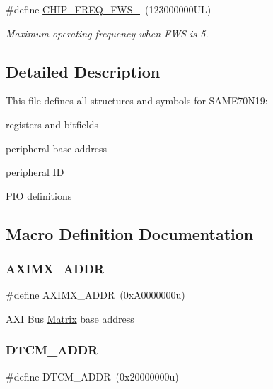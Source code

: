 \begin{DoxyCompactItemize}
\mbox{\label{group__SAME70N19__definitions_ga3b66824f858591135877b369f98d48a5}} 
\#define \mbox{\hyperlink{group__SAME70N19__definitions_ga3b66824f858591135877b369f98d48a5}{C\+H\+I\+P\+\_\+\+F\+R\+E\+Q\+\_\+\+F\+W\+S\+\_}}~(123000000\+U\+L)
\begin{DoxyCompactList}\small\item\em Maximum operating frequency when F\+WS is 5. \end{DoxyCompactList}\end{DoxyCompactItemize}


\subsection{Detailed Description}
This file defines all structures and symbols for S\+A\+M\+E70\+N19\+:
\begin{DoxyItemize}
\item registers and bitfields
\item peripheral base address
\item peripheral ID
\item P\+IO definitions 
\end{DoxyItemize}

\subsection{Macro Definition Documentation}
\mbox{\label{group__SAME70N19__definitions_ga2fb7cc681bf5e7fbce5e3635b72a330a}} 
\subsubsection{\texorpdfstring{AXIMX\_ADDR}{AXIMX\_ADDR}}
{\footnotesize\ttfamily \#define A\+X\+I\+M\+X\+\_\+\+A\+D\+DR~(0x\+A0000000u)}

A\+XI Bus \mbox{\hyperlink{structMatrix}{Matrix}} base address \mbox{\label{group__SAME70N19__definitions_ga26626a425f7ebb3a0c2dbc276f0d9f78}} 
\subsubsection{\texorpdfstring{DTCM\_ADDR}{DTCM\_ADDR}}
{\footnotesize\ttfamily \#define D\+T\+C\+M\+\_\+\+A\+D\+DR~(0x20000000u)}

